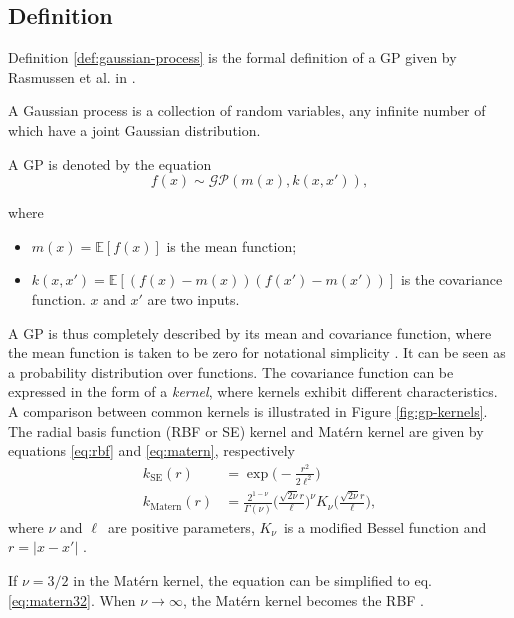 \subsection{Definition}

Definition \ref{def:gaussian-process} is the formal definition of a GP given by Rasmussen et al. in \cite{Rasmussen2006}.
\begin{definition} \label{def:gaussian-process}
    A Gaussian process is a collection of random variables, any infinite number of which have a joint Gaussian distribution.
\end{definition}

A GP is denoted by the equation
\begin{equation} \label{eq:GP-eq1}
    f(x) \sim \mathcal{GP}(m(x), k(x, x')),
\end{equation}

where 
\begin{itemize}
    \item $m(x) = \mathbb{E}[f(x)]$ is the mean function;
    \item $k(x, x') = \mathbb{E}[(f(x) - m(x))(f(x') - m(x'))]$ is the covariance function.
    $x$ and $x'$ are two inputs.
\end{itemize}

A GP is thus completely described by its mean and covariance function, where the mean function is taken to be zero for notational simplicity \cite{Rasmussen2006}.
It can be seen as a probability distribution over functions.
The covariance function can be expressed in the form of a \textit{kernel}, where kernels exhibit different characteristics.
A comparison between common kernels is illustrated in Figure \ref{fig:gp-kernels}.
The radial basis function (RBF or SE) kernel and Matérn kernel are given by equations \ref{eq:rbf} and \ref{eq:matern}, respectively
\begin{align}
k_{\textrm{SE}}(r) &= \exp{\Big(-\frac{r^2}{2\ell^2}\Big)} \label{eq:rbf} \\
k_{\textrm{Matern}}(r) &= \frac{2^{1-\nu}}{\Gamma(\nu)} \Big(\frac{\sqrt{2\nu}r}{\ell}\Big)^\nu K_\nu\Big(\frac{\sqrt{2\nu}r}{\ell}\Big), \label{eq:matern}
\end{align}
where $\nu$ and $\ell$ are positive parameters, $K_\nu$ is a modified Bessel function and $r = |x-x'|$ \cite{Rasmussen2006}.

If $\nu = 3/2$ in the Matérn kernel, the equation can be simplified to eq. \ref{eq:matern32}.
When $\nu \rightarrow \infty$, the Matérn kernel becomes the RBF \cite{Rasmussen2006}.

